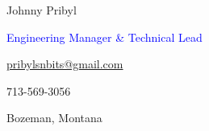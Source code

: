 \documentclass[11pt]{resume}
\begin{document}
    \noindent\begin{minipage}[t]{0.73\textwidth}
        \vspace{-4mm}
        {\par \Huge Johnny Pribyl}
        {\par \Large \textcolor{blue}{Engineering Manager \& Technical Lead}}
    \end{minipage}
    \begin{minipage}[t]{0.25\textwidth}
        \begin{flushright}
            {\par \textcolor{black}{\href{mailto:pribylsnbits@gmail.com}{pribylsnbits@gmail.com}}}
            {\par 713-569-3056}
            {\par Bozeman, Montana}
        \end{flushright}
    \end{minipage}
    \begin{minipage}[t]{0.03\textwidth}
        \begin{center}
            {\par \faEnvelope[regular]} 
            {\par \faMobile*} 
            {\par \faMapMarker*} 
        \end{center}
        \vspace{.01mm}
    \end{minipage}

    \noindent\begin{minipage}[t]{1\textwidth}
      \makebox[\linewidth]{\rule{\paperwidth}{0.2pt}}
    \end{minipage}
\end{document}
